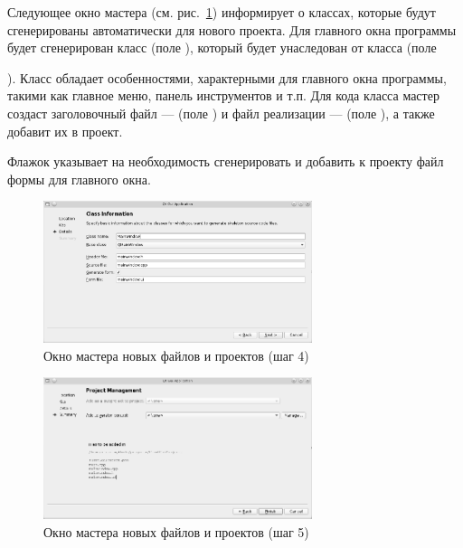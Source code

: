 Следующее окно мастера (см. рис.~\ref{ch11:refDrawing5}) информирует о классах, которые
будут сгенерированы автоматически для нового проекта. Для главного окна программы будет сгенерирован класс
 (поле ), который будет
унаследован от класса  (поле {).
Класс  обладает особенностями, характерными 
для главного окна программы, такими как главное меню, панель
инструментов и т.п. Для кода класса  мастер создаст заголовочный файл --- 
 (поле ) и файл реализации --- 
 (поле ), а также добавит их
в проект.

Флажок  указывает на необходимость сгенерировать и добавить
к проекту файл формы для главного окна. 

\begin{figure}[htb]
\begin{center}
\includegraphics[width=0.7\textwidth]{img/ris_11_6}
\caption{Окно мастера новых файлов и проектов (шаг 4)}
\label{ch11:refDrawing5}
\end{center}
\end{figure}

\begin{figure}[htb]
\begin{center}
\includegraphics[width=0.7\textwidth]{img/ris_11_7}
\caption{Окно мастера новых файлов и проектов (шаг 5)}
\label{ch11:refDrawing6}
\end{center}
\end{figure}

}
